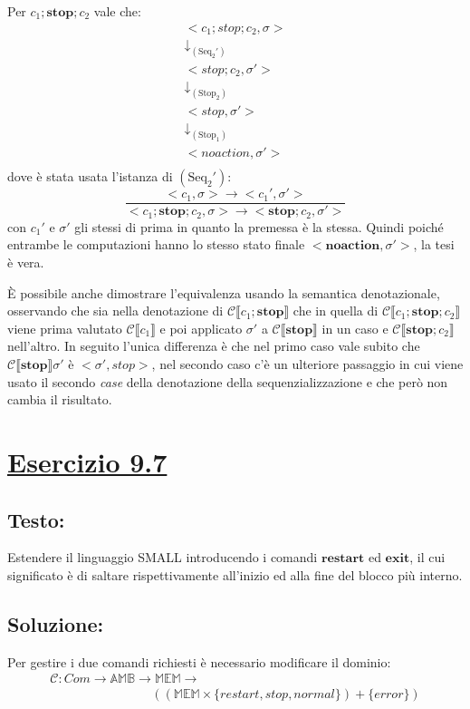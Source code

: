\documentclass[a4paper,twosides]{report}
\newcommand{\sectionline}{
  \begin{center}
    \resizebox{0.5\linewidth}{5ex}{
      \hyperref[toc]{
        \begin{tikzpicture}
          \node  (C) at (0,0) {};
          \node (D) at (10,0) {};
          \path (C) to [ornament=84] (D);
        \end{tikzpicture}
      }
    }
  \end{center}
}
\begin{document}
Per $c_1;\mathbf{stop};c_2$ vale che:
\begin{gather*}
  <c_1;stop;c_2,\sigma>\\
  \downarrow_{(\text{Seq}_2')}\\
  <stop;c_2,\sigma'>\\
  \downarrow_{(\text{Stop}_2)}\\
  <stop,\sigma'>\\
  \downarrow_{(\text{Stop}_1)}\\
  <noaction,\sigma'>\\
\end{gather*}
dove \`e stata usata l'istanza di $(\text{Seq}_2')$:
$$
\frac{<c_1,\sigma> \longrightarrow{}
  <c_1',\sigma'>}{<c_1;\mathbf{stop};c_2,\sigma> \longrightarrow{}
  <\mathbf{stop};c_2,\sigma'>}
$$
con $c_1'$ e $\sigma'$ gli stessi di prima in quanto la premessa è la
stessa. Quindi poich\'e entrambe le computazioni hanno lo stesso stato
finale $<\mathbf{noaction},\sigma'>$, la tesi
\`e vera.

\`E possibile anche dimostrare l'equivalenza usando la semantica
denotazionale, osservando che sia nella denotazione di $\mathcal{C}\llbracket
c_1;\mathbf{stop}\rrbracket$ che in quella di $\mathcal{C}\llbracket
c_1;\mathbf{stop};c_2\rrbracket$ viene prima valutato $\mathcal{C}\llbracket
c_1\rrbracket$ e poi applicato $\sigma'$ a $\mathcal{C}\llbracket
\mathbf{stop}\rrbracket$ in un caso e $\mathcal{C}\llbracket
\mathbf{stop};c_2\rrbracket$ nell'altro. In seguito l'unica differenza
\`e che nel primo caso vale subito che $\mathcal{C}\llbracket
\mathbf{stop}\rrbracket\sigma'$ \`e $<\sigma',stop>$, nel secondo caso
c'è un ulteriore passaggio in cui viene usato il secondo \emph{case}
della denotazione della sequenzializzazione e che per\`o non cambia il
risultato.

\sectionline
\section*{\hyperref[toc]{Esercizio 9.7}}
\subsection*{Testo:} Estendere il linguaggio SMALL introducendo i
comandi $\mathbf{restart}$ ed $\mathbf{exit}$, il cui significato è di 
saltare rispettivamente all’inizio ed alla fine del blocco più
interno.

\subsection*{Soluzione:} Per gestire i due comandi richiesti \`e
necessario modificare il dominio:
\begin{equation*}
  \begin{multlined}  
    \mathcal{C}:Com \longrightarrow{} \mathbb{AMB}
    \longrightarrow{} \mathbb{MEM} \longrightarrow{}\\
    \qquad\qquad\qquad\qquad((\mathbb{MEM}\times\{restart, stop, normal\})+\{error\})
  \end{multlined}  
\end{equation*}
\end{document}
